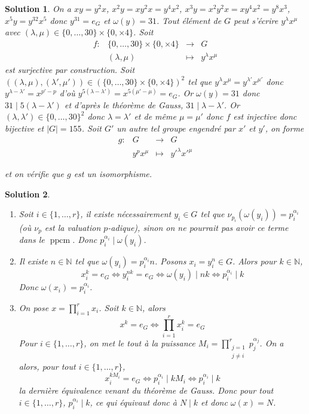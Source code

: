 \documentclass[12pt]{article}
\newtheorem{solution}{Solution}[section]
\theoremstyle{remark}
\newcommand{\N}{\mathbb{N}} \newcommand{\Z}{\mathbb{Z}}
\DeclareMathOperator{\ppcm}{ppcm}
\newcommand{\function}[5]{
	$$
	\begin{array}{rccl}
		#1: & #2 & \to & #3 \\
		& #4 & \mapsto & #5
	\end{array}
	$$
}
\numberwithin{equation}{section}
\begin{document}
\begin{solution}
	On a $xy=y^{2}x$, $x^{2}y=xy^{2}x=y^{4}x^{2}$, $x^{3}y=x^{2}y^{2}x=xy^{4}x^{2}=y^{8}x^{3}$, $x^{5}y=y^{32}x^{5}$ donc $y^{31}=e_{G}$ et $\omega(y)=31$. Tout élément de $G$ peut s'écrire $y^{\lambda}x^{\mu}$ avec $(\lambda,\mu)\in\{0,\dots,30\}\times\{0,\times 4\}$. Soit \function{f}{\{0,\dots,30\}\times\{0,\times 4\}}{G}{(\lambda,\mu)}{y^{\lambda}x^{\mu}} est surjective par construction. Soit $((\lambda,\mu),(\lambda',\mu'))\in(\{0,\dots,30\}\times\{0,\times 4\})^{2}$ tel que $y^{\lambda}x^{\mu}=y^{\lambda'}x^{\mu'}$ donc $y^{\lambda-\lambda'}=x^{p'-p}$ d'où $y^{5(\lambda-\lambda')}=x^{5(\mu'-\mu)}=e_{G}$. Or $\omega(y)=31$ donc $31\mid 5(\lambda-\lambda')$ et d'après le théorème de Gauss, $31\mid \lambda-\lambda'$. Or $(\lambda,\lambda')\in\{0,\dots,30\}^{2}$ donc $\lambda=\lambda'$ et de même $\mu=\mu'$ donc $f$ est injective donc bijective et $\vert G\vert=155$. Soit $G'$ un autre tel groupe engendré par $x'$ et $y'$, on forme \function{g}{G}{G}{y^{p}x^{\mu}}{y'^{\lambda}x'^{\mu}}
	et on vérifie que $g$ est un isomorphisme.
\end{solution}

\begin{solution}
	\phantom{}
	\begin{enumerate}
		\item Soit $i\in\{1,\dots,r\}$, il existe nécessairement $y_{i}\in G$ tel que $\nu_{p_{i}}(\omega(y_{i}))=p_{i}^{\alpha_{i}}$ (où $\nu_{p}$ est la valuation $p$-adique), sinon on ne pourrait pas avoir ce terme dans le $\ppcm$. Donc $p_{i}^{\alpha_{i}}\mid \omega(y_{i})$.
		
		\item Il existe $n\in\N$ tel que $\omega(y_{i})=p_{i}^{\alpha_{i}}n$. Posons $x_{i}=y_{i}^{n}\in G$. Alors pour $k\in\N$,
		$$x_{i}^{k}=e_{G}\Longleftrightarrow y_{i}^{nk}=e_{G}\Longleftrightarrow \omega(y_{i})\mid nk\Longleftrightarrow p_{i}^{\alpha_{i}}\mid k$$
		Donc $\omega(x_{i})=p_{i}^{\alpha_{i}}$.

		\item On pose $x=\prod_{i=1}^{r}x_{i}$. Soit $k\in\N$, alors 
		$$x^{k}=e_{G}\Longleftrightarrow \prod_{i=1}^{r}x_{i}^{k}=e_{G}$$
		Pour $i\in\{1,\dots,r\}$, on met le tout à la puissance $M_{i}=\prod_{\substack{j=1\\j\neq i}}^{r}p_{j}^{\alpha_{j}}$. On a alors, pour tout $i\in\{1,\dots,r\}$,
		$$x_{i}^{kM_{i}}=e_{G}\Longleftrightarrow p_{i}^{\alpha_{i}}\mid kM_{i}\Longleftrightarrow p_{i}^{\alpha_{i}}\mid k$$
		la dernière équivalence venant du théorème de Gauss. Donc pour tout $i\in\{1,\dots,r\}$, $p_{i}^{\alpha_{i}}\mid k$, ce qui équivaut donc à $N\mid k$ et donc $\omega(x)=N$.
	\end{enumerate}
\end{solution}
\end{document}
